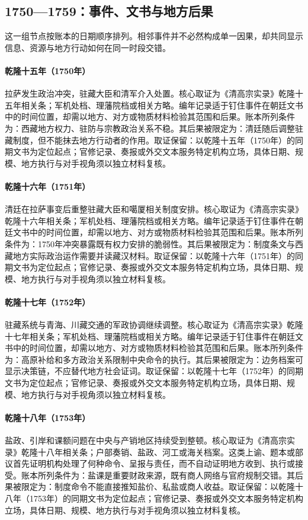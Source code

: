 \subsection{1750—1759：事件、文书与地方后果}
这一组节点按账本的日期顺序排列。相邻事件并不必然构成单一因果，却共同显示信息、资源与地方行动如何在同一时段交错。
\hypertarget{ledger:EQ-1750-LHASA-UPRISING}{}\paragraph{乾隆十五年（1750年）}拉萨发生政治冲突，驻藏大臣和清军介入处置。核心取证为《清高宗实录》乾隆十五年相关条；军机处档、理藩院档或相关方略。编年记录适于钉住事件在朝廷文书中的时间位置，却需以地方、对方或物质材料检验其范围和后果。账本所列条件为：西藏地方权力、驻防与宗教政治关系不稳。其后果被限定为：清廷随后调整驻藏制度，但不能抹去地方行动者的作用。取证保留：以乾隆十五年（1750年）的同期文书为定位起点；官修记录、奏报或外交文本服务特定机构立场，具体日期、规模、地方执行与对手视角须以独立材料复核。
\hypertarget{ledger:EQ-1751-TIBET-ORDINANCE}{}\paragraph{乾隆十六年（1751年）}清廷在拉萨事变后重整驻藏大臣和噶厦相关制度安排。核心取证为《清高宗实录》乾隆十六年相关条；军机处档、理藩院档或相关方略。编年记录适于钉住事件在朝廷文书中的时间位置，却需以地方、对方或物质材料检验其范围和后果。账本所列条件为：1750年冲突暴露既有权力安排的脆弱性。其后果被限定为：制度条文与西藏地方实际政治运作需要并读藏汉材料。取证保留：以乾隆十六年（1751年）的同期文书为定位起点；官修记录、奏报或外交文本服务特定机构立场，具体日期、规模、地方执行与对手视角须以独立材料复核。
\hypertarget{ledger:EQ-1752-TIBETAN-ADMINISTRATION}{}\paragraph{乾隆十七年（1752年）}驻藏系统与青海、川藏交通的军政协调继续调整。核心取证为《清高宗实录》乾隆十七年相关条；军机处档、理藩院档或相关方略。编年记录适于钉住事件在朝廷文书中的时间位置，却需以地方、对方或物质材料检验其范围和后果。账本所列条件为：高原补给和多方政治关系限制中央命令的执行。其后果被限定为：边务档案可显示决策链，不应替代地方社会证词。取证保留：以乾隆十七年（1752年）的同期文书为定位起点；官修记录、奏报或外交文本服务特定机构立场，具体日期、规模、地方执行与对手视角须以独立材料复核。
\hypertarget{ledger:EQ-1753-SALT-ADMINISTRATION}{}\paragraph{乾隆十八年（1753年）}盐政、引岸和课额问题在中央与产销地区持续受到整顿。核心取证为《清高宗实录》乾隆十八年相关条；户部奏销、盐政、河工或海关档案。这类上谕、题本或部议首先证明机构处理了何种命令、呈报与责任，而不自动证明地方收到、执行或接受。账本所列条件为：盐课是重要财政来源，既有商人网络与官府规制交错。其后果被限定为：制度命令不能直接推知盐价、私盐或商人收益。取证保留：以乾隆十八年（1753年）的同期文书为定位起点；官修记录、奏报或外交文本服务特定机构立场，具体日期、规模、地方执行与对手视角须以独立材料复核。
